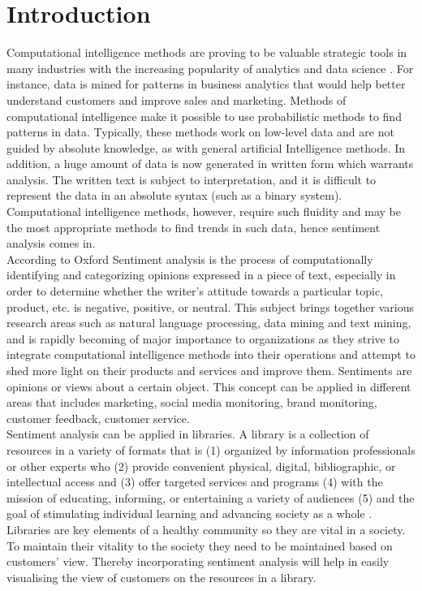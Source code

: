 \documentclass[12pt]{report}
\begin{document}
	\section{Introduction}
	Computational intelligence methods are proving to be valuable strategic tools in many industries with the increasing popularity of analytics and data science \cite{yang2016social}. For instance, data is mined for patterns in business analytics that would help better understand customers and improve sales and marketing. Methods of computational intelligence make it possible to use probabilistic methods to find patterns in data. Typically, these methods work on low-level data and are not guided by absolute knowledge, as with general artificial Intelligence methods. In addition, a huge amount of data is now generated in written form which warrants analysis. The written text is subject to interpretation, and it is difficult to represent the data in an absolute syntax (such as a binary system). Computational intelligence methods, however, require such fluidity and may be the most appropriate methods to find trends in such data, hence sentiment analysis comes in.\\
	According to Oxford Sentiment analysis is the process of computationally identifying and categorizing opinions expressed in a piece of text, especially in order to determine whether the writer's attitude towards a particular topic, product, etc. is negative, positive, or neutral. This subject brings together various research areas such as natural language processing, data mining and text mining, and is rapidly becoming of major importance to organizations as they strive to integrate computational intelligence methods into their operations and attempt to shed more light on their products and services and improve them. Sentiments are opinions or views about a certain object. This concept can be applied in different areas that includes marketing, social media monitoring, brand monitoring, customer feedback, customer service.\\
	Sentiment analysis can be applied in libraries. A library is a collection of resources in a variety of formats that is (1) organized by information professionals or other experts who (2) provide convenient physical, digital, bibliographic, or intellectual access and (3) offer targeted services and programs (4) with the mission of educating, informing, or entertaining a variety of audiences (5) and the goal of stimulating individual learning and advancing society as a whole \citep{eberhart2010librarian}. Libraries are key elements of a healthy community so they are vital in a society. To maintain their vitality to the society they need to be maintained based on customers’ view. Thereby incorporating sentiment analysis will help in easily visualising the view of customers on the resources in a library.
		
\end{document}
